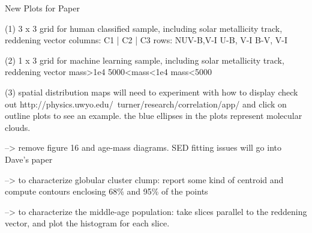 New Plots for Paper

(1)
3 x 3 grid for human classified sample, including solar metallicity track, reddening vector
columns: C1 | C2 | C3
rows:
NUV-B,V-I
U-B, V-I
B-V, V-I

(2)
1 x 3 grid for machine learning sample, including solar metallicity track, reddening vector
mass>1e4
5000<mass<1e4
mass<5000

(3) spatial distribution maps 
will need to experiment with how to display
check out http://physics.uwyo.edu/~turner/research/correlation/app/ and click on outline plots to see an example.  the blue ellipses in the plots represent molecular clouds.

--> remove figure 16 and age-mass diagrams.  SED fitting issues will go into Dave's paper

--> to characterize globular cluster clump: report some kind of centroid and compute contours enclosing 68\% and 95\% of the points

--> to characterize the middle-age population: take slices parallel to the reddening vector, and plot the histogram for each slice.  